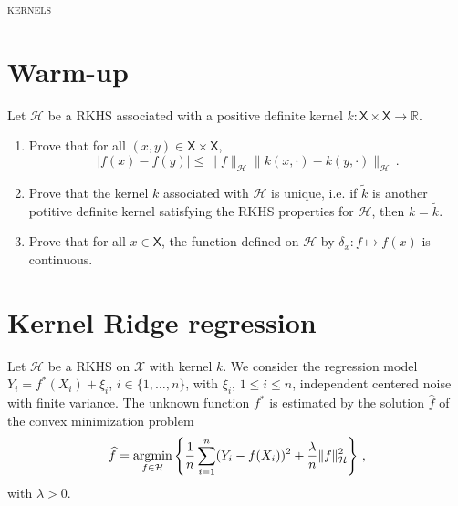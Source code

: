 \documentclass[a4paper,10pt,fleqn]{article}
\newcommand{\eqsp}{\,}
\newcommand{\rset}{\ensuremath{\mathbb{R}}}
\newcommand{\calH}{\ensuremath{\mathcal{H}}}
\newcommand{\xset}{\ensuremath{\mathsf{X}}}
\newcommand{\1}{\ensuremath{\mathbbm{1}}}
\newcommand{\argmin}{\mathop{\textrm{argmin}}}
\begin{document}

\noindent\hrulefill

\begin{center}
\textsc{kernels}
\end{center}
\hrulefill

\medskip



\section*{Warm-up}
 Let $\calH$ be a RKHS associated with a positive definite kernel $k: \xset\times \xset \to \rset$.
\begin{enumerate}
\item  Prove that for all $(x,y)\in\xset\times \xset$, 
$$
|f(x)-f(y)|\leqslant \|f\|_{\calH}\|k(x,\cdot)-k(y,\cdot)\|_{\calH}\eqsp.
$$

%

\item  Prove that the kernel $k$ associated with $\calH$ is unique, i.e. if $\widetilde k$ is another potitive definite kernel satisfying the RKHS properties for $\calH$, then $k = \widetilde k$.

%

\item  Prove that  for all $x\in\xset$, the function defined on $\calH$ by $\delta_x: f \mapsto f(x)$ is continuous.

\vspace{.2cm}

{\em

}
\end{enumerate}

\section*{Kernel Ridge regression}
Let $\mathcal{H}$ be a RKHS on $\mathcal{X}$ with kernel $k$.  We consider the regression model $Y_{i}=f^*(X_{i})+\xi_{i}$, $i\in\{1,\ldots,n\}$, with $\xi_{i}$, $1\leq i \leq n$,  independent centered noise with finite variance. The unknown function $f^*$ is estimated  by the solution 
$\widehat f$  of the convex minimization problem
$$\widehat f=\argmin_{f\in\mathcal{H}}\left\{{1\over n}\sum_{i=1}^n(Y_{i}-f(X_{i}))^2+{\lambda\over n} \|f\|_{\mathcal{H}}^2\right\}\,,$$
with $\lambda>0$.
\end{document}
